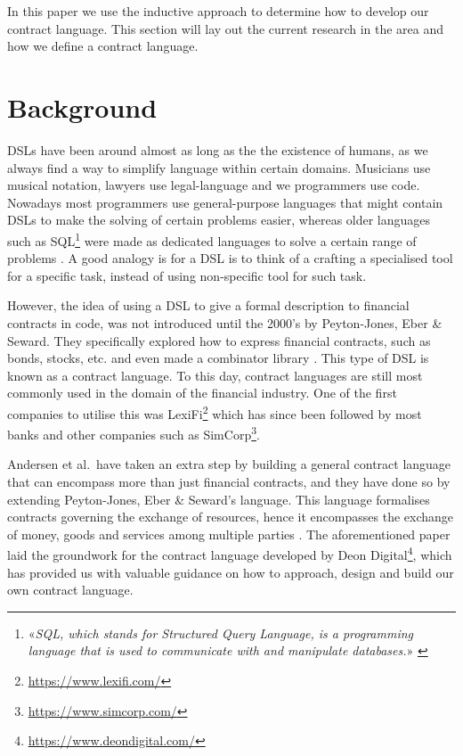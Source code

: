 \documentclass{ituthesis}
\begin{document}

In this paper we use the inductive approach to determine how to develop our contract language. This section will lay out the current research in the area and how we define a contract language.

\section{Background}
DSLs have been around almost as long as the the existence of humans, as we always find a way to simplify language within certain domains. Musicians use musical notation, lawyers use legal-language and we programmers use code. Nowadays most programmers use general-purpose languages that might contain DSLs to make the solving of certain problems easier, whereas older languages such as SQL\footnote{«\textit{SQL, which stands for Structured Query Language, is a programming language that is used to communicate with and manipulate databases.}» \cite{whatisSQL}} were made as dedicated languages to solve a certain range of problems \cite{van2000domain}. A good analogy is for a DSL is to think of a crafting a specialised tool for a specific task, instead of using non-specific tool for such task.

However, the idea of using a DSL to give a formal description to financial contracts in code, was not introduced until the 2000's by Peyton-Jones, Eber \& Seward. They specifically explored how to express financial contracts, such as bonds, stocks, etc. and even made a combinator library \cite{peyton2000composing}. This type of DSL is known as a contract language. To this day, contract languages are still most commonly used in the domain of the financial industry. One of the first companies to utilise this was LexiFi\footnote{\url{https://www.lexifi.com/}} which has since been followed by most banks and other companies such as SimCorp\footnote{\url{https://www.simcorp.com/}}.

Andersen et al.\ have taken an extra step by building a general contract language that can encompass more than just financial contracts, and they have done so by extending Peyton-Jones, Eber \& Seward's language. This language formalises contracts governing the exchange of resources, hence it encompasses the exchange of money, goods and services among multiple parties \cite{andersen2006compositional}. The aforementioned paper laid the groundwork for the contract language developed by Deon Digital\footnote{\url{https://www.deondigital.com/}}, which has provided us with valuable guidance on how to approach, design and build our own contract language.
\end{document}
